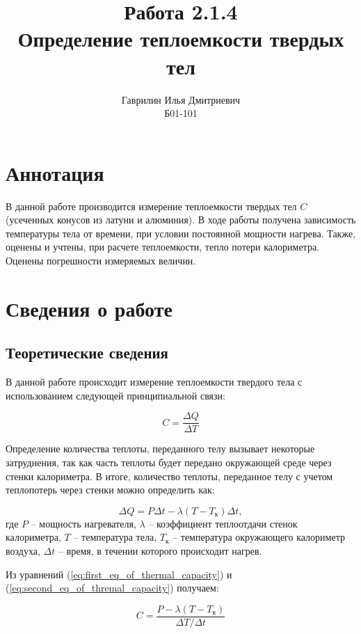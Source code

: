 \documentclass[a4paper, 12pt]{article}%
\author{Гаврилин Илья Дмитриевич \\
	Б01-101}
\title{\textbf{Работа 2.1.4 \\ 
		Определение теплоемкости твердых тел}}
\begin{document}
	\maketitle
	\section{Аннотация}
	В данной работе производится измерение теплоемкости твердых тел $C$ (усеченных конусов из латуни и алюминия). В ходе работы получена зависимость температуры тела от времени, при условии постоянной мощности нагрева. Также, оценены и учтены, при расчете теплоемкости, тепло потери калориметра. Оценены погрешности измеряемых величин.
	\section{Сведения о работе}
	\subsection{Теоретические сведения}
	В данной работе происходит измерение теплоемкости твердого тела с использованием следующей принципиальной связи:
	
	\begin{equation}
		C = \frac{\Delta Q}{\Delta T}
		\label{eq:first_eq_of_thermal_capacity}
	\end{equation}
	
	Определение количества теплоты, переданного телу вызывает некоторые затруднения, так как часть теплоты будет передано окружающей среде через стенки калориметра. В итоге, количество теплоты, переданное телу с учетом теплопотерь через стенки можно определить как:
	
	\begin{equation}
		\Delta Q = P\Delta t - \lambda \left( T - T_{\text{к}} \right) \Delta t,
		\label{eq:termal_with_heat_lossing}
	\end{equation}
	где $P$ -- мощность нагревателя, $\lambda$ -- коэффициент теплоотдачи стенок калориметра, $T$ -- температура тела, $T_{\text{к}}$ -- температура окружающего калориметр воздуха, $\Delta t$ -- время, в течении которого происходит нагрев.
	
	Из уравнений (\ref{eq:first_eq_of_thermal_capacity}) и (\ref{eq:second_eq_of_thremal_capacity}) получаем:
	
	\begin{equation}
		C = \frac{P - \lambda \left(T - T_{\text{к}} \right) }{\Delta T /\Delta t}
		\label{eq:second_eq_of_thremal_capacity}
	\end{equation}
	
\end{document}
